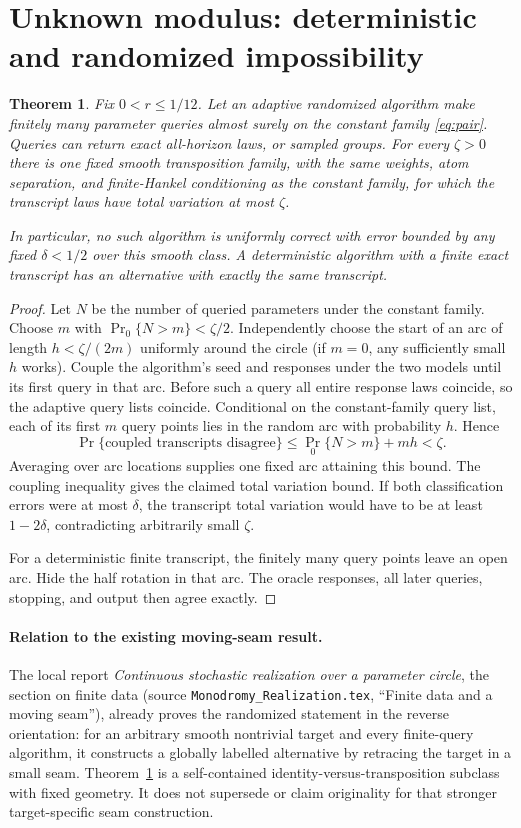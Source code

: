 \documentclass[11pt]{article}
\newtheorem{theorem}{Theorem}[section]
\theoremstyle{remark}\newtheorem{remark}[theorem]{Remark}
\begin{document}
\section{Unknown modulus: deterministic and randomized impossibility}
\begin{theorem}\label{thm:unknown}
Fix $0<r\leq1/12$. Let an adaptive randomized algorithm make finitely many parameter queries almost surely on the constant family \eqref{eq:pair}. Queries can return exact all-horizon laws, or sampled groups. For every $\zeta>0$ there is one fixed smooth transposition family, with the same weights, atom separation, and finite-Hankel conditioning as the constant family, for which the transcript laws have total variation at most $\zeta$.

In particular, no such algorithm is uniformly correct with error bounded by any fixed $\delta<1/2$ over this smooth class. A deterministic algorithm with a finite exact transcript has an alternative with exactly the same transcript.
\end{theorem}
\begin{proof}
Let $N$ be the number of queried parameters under the constant family. Choose $m$ with $\Pr_0\{N>m\}<\zeta/2$. Independently choose the start of an arc of length $h<\zeta/(2m)$ uniformly around the circle (if $m=0$, any sufficiently small $h$ works). Couple the algorithm's seed and responses under the two models until its first query in that arc. Before such a query all entire response laws coincide, so the adaptive query lists coincide. Conditional on the constant-family query list, each of its first $m$ query points lies in the random arc with probability $h$. Hence
\[
 \Pr\{\text{coupled transcripts disagree}\}
 \leq\Pr_0\{N>m\}+mh<\zeta.
\]
Averaging over arc locations supplies one fixed arc attaining this bound. The coupling inequality gives the claimed total variation bound. If both classification errors were at most $\delta$, the transcript total variation would have to be at least $1-2\delta$, contradicting arbitrarily small $\zeta$.

For a deterministic finite transcript, the finitely many query points leave an open arc. Hide the half rotation in that arc. The oracle responses, all later queries, stopping, and output then agree exactly.
\end{proof}

\paragraph{Relation to the existing moving-seam result.}
The local report \emph{Continuous stochastic realization over a parameter circle}, the section on finite data (source \texttt{Monodromy\_Realization.tex}, ``Finite data and a moving seam''), already proves the randomized statement in the reverse orientation: for an arbitrary smooth nontrivial target and every finite-query algorithm, it constructs a globally labelled alternative by retracing the target in a small seam. Theorem~\ref{thm:unknown} is a self-contained identity-versus-transposition subclass with fixed geometry. It does not supersede or claim originality for that stronger target-specific seam construction.
\end{document}
